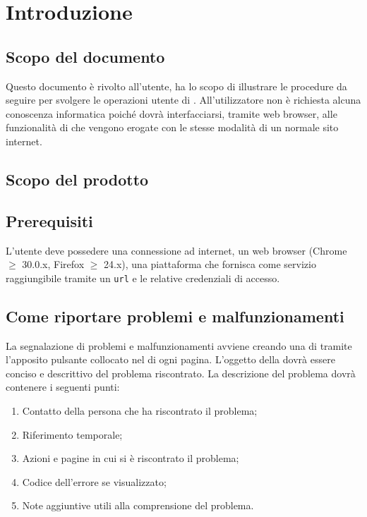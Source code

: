 \section{Introduzione}


	\subsection{Scopo del documento}
	Questo documento è rivolto all'utente, ha lo scopo di illustrare le procedure da seguire per svolgere le operazioni utente di . All'utilizzatore non è richiesta alcuna conoscenza informatica poiché dovrà interfacciarsi, tramite web browser, alle funzionalità di  che vengono erogate con le stesse modalità di un normale sito internet.

	\subsection{Scopo del prodotto}
	\ScopoDelProdotto{}

	\subsection{Prerequisiti}
	L'utente deve possedere una connessione ad internet, un web browser (Chrome $\geq$ 30.0.x, Firefox $\geq$ 24.x), una piattaforma che fornisca  come servizio raggiungibile tramite un \texttt{url} e le relative credenziali di accesso.

	
	\subsection{Come riportare problemi e malfunzionamenti}
	La segnalazione di problemi e malfunzionamenti avviene creando una  di  tramite l'apposito pulsante collocato nel  di ogni pagina. L'oggetto della  dovrà essere conciso e descrittivo del problema riscontrato. La descrizione del problema dovrà contenere i seguenti punti:

	\begin{enumerate}
		\item Contatto della persona che ha riscontrato il problema;
		\item Riferimento temporale;
		\item Azioni e pagine in cui si è riscontrato il problema;
		\item Codice dell'errore se visualizzato;
		\item Note aggiuntive utili alla comprensione del problema.
	\end{enumerate}

